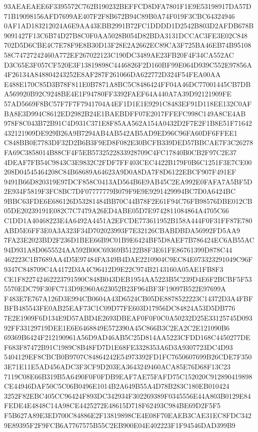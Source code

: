 \documentclass[UTF8,fontset=fandol,zihao=-4,a4paper]{ctexart}
\begin{document}
{{93AEAEAEE6F3395572C762B190232BEFFCD8DFA7801F1E9E53198917DA57D71B19098156AFD7699AE407F2F8B672B94C89B0A74F019F3CBC64324946
0AF1AD183212024A6E9AA43EBB2991B72FC1DDDD1D2542B803D2AFDB678B9091427F13C6B74D27B8C0F0AA5028B054D82BDA3131DCCAC3FE3E02C848
702D5D6CBE4C7E78F9E8B30D13F28E2A2662EC89CA3F725BA46EB74B9510858C74727242460A772EF267022123C190DC3489AE23FB20F4F34CA552AC
D3C65E3F057CF520E3F13819898C4446826F2D160BF99E064D939C552E97856A4F26134A848804243252E8AF287F261066DA622772D324F54FEA00AA
E488E170C85D3B78F811E0B7871A8BC5C8486424FF04A46DC77001445CB7DBA569920B92C9248BE4E1F94780FF3392FAEF64A440A7A39D92121909FE
57AD5669F8BC57F7F7F7941704A4EF1D1E1E9291C8483EF91D118EE132C0AFBA8E3D994C8612ED2982B24E1BAEBDFF07E2017FFEFC998C149A8CE4AB
978F8C043B72B91C4D931C371E8F85AA562A154A0432D2F7E2F1B8E51F71642432121909DE929B26A9B7294AB4AB542AB5AD9ED96C96FA60DF6FFEE1
C848BB0E7783DF32D2B6B3F9ED8F082E30BCFB339DED57BBCAE7F3C26278FA69C3858014B88CF4F5EB5732522833928709C4FC17840B0CB2F97C2E37
4DEAF7FB54C9843C3E9832C2FDF7FF403CEC4422B179F0B6C1251F3E7CE00208D04545464208C84B68689A64623A9D0A8DA7F8D6122EBCF907F491EF
9491B66D820319E97DCF858C0413AD564B6E9AB45C2EA992E0FAFA7A5BF5D2E934F5819F3FC8BC7DF07777779B079F9E9E9291429994BC7D0A6424BC
9BBC63FDE6E686126D53281484BB70C44B78F2E61F94C76FB98576DBE012CB05DE20239191E082C7C7479A26ED4ABE05D7E9742811084864A4705C66
C1DD1A40468223E4A6492A4451A2EFCDE773611952B158A444F0F31FF87E780ABD5E6FF3E0A3A323F34D702023993F7E32126CBABDBDA56992FD5AA9
7FA23E2023BD2F236D1BEE66B9C01B9E6424BF5D8AEF7B786424EC6AB55AC94D931A8D0655524AA592B00C69369B5122B8F3E61FE86761399D878C44
462223C1B7689AA4D5E97484FA349B4DAE2210904C9EC84E073323291049C96F9347C848709C4A4172D3A4C96412D9E22C974B2143160A05AE1FB8F3
CE1F822742462223791590C848B043DEB1954AA5223B5C239D4E6F2BCBF5F535570EDC79F30FC713D9E960A623052B23F964BF3F19097B522E97699A
F483E7E767A126D3E994CB0604A43D6524CB05DE8878522223C14372D3A4FBFBFB485543FE0AB25EAF73C1C09D77FE603D17956DC84824A53D5DB776
7E2E1909F6D134E9D57ABD4E2693DBEAF0F0F0C0A50232D25E33125745D09392FF33129719DEE1E6E6468849E572390A45C866B3C2EA2C2E121090B6
69369B6424F212190961A56D9AD46AB5C25D814AA5223CFDD168C4450277DEF683F87472B91C1989C8B48FD7D1E68FE3328353A6D3A9307723DC4D93
5404129EF8CBCB0B9707C84864242E54973392FD1FC7650607699B26CDE7F3503E71E11E5AD456ADC3F3CF9D203EA3643249460ACA85E76D68F13C23
7119C08E66B319B5A6490F0F0FDB9EAF7AE75FAFD75C152020C912890419898CE44946DAF50C5C06B0496E1014B2A649B55A4D78B283C180EB010424
3252F82EBC405CC96424F893DC342934F302269389F0345556E44A803B0129E84FEDE4E4848C14A98CE4425272E48615D718F62493C984BE69D2F5F5
F5B627A89E3ED700C84886E2F13819898CE4E08F70EAEB3CAE31EC8FDC3429E89395F2F9FCB6A7767575B55C2EB900E04E402223F1F94546DAD399B9
}}
\end{document}
